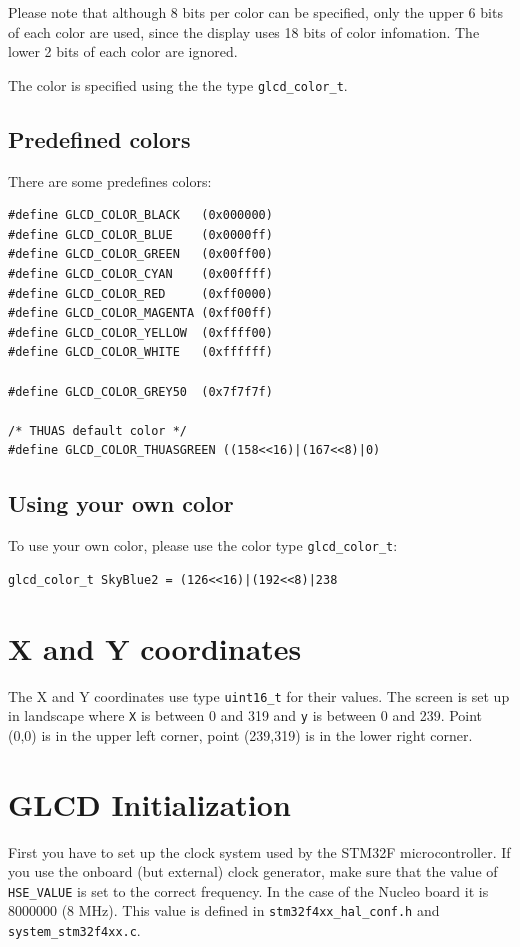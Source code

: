 \documentclass[12pt]{article}
\begin{document}
Please note that although 8 bits per color can be specified, only the upper 6 bits of each color are used, since the display uses 18 bits of color infomation. The lower 2 bits of each color are ignored.

The color is specified using the the type \lstinline|glcd_color_t|.

\subsection{Predefined colors}
There are some predefines colors:

\begin{lstlisting}
#define GLCD_COLOR_BLACK   (0x000000)
#define GLCD_COLOR_BLUE    (0x0000ff)
#define GLCD_COLOR_GREEN   (0x00ff00)
#define GLCD_COLOR_CYAN    (0x00ffff)
#define GLCD_COLOR_RED     (0xff0000)
#define GLCD_COLOR_MAGENTA (0xff00ff)
#define GLCD_COLOR_YELLOW  (0xffff00)
#define GLCD_COLOR_WHITE   (0xffffff)

#define GLCD_COLOR_GREY50  (0x7f7f7f)

/* THUAS default color */
#define GLCD_COLOR_THUASGREEN ((158<<16)|(167<<8)|0)
\end{lstlisting}

\subsection{Using your own color}
To use your own color, please use the color type \lstinline|glcd_color_t|:

\begin{lstlisting}
glcd_color_t SkyBlue2 = (126<<16)|(192<<8)|238
\end{lstlisting}

\section{X and Y coordinates}
The X and Y coordinates use type \lstinline|uint16_t| for their values. The screen is set up in landscape where \lstinline|X| is between 0 and 319 and \lstinline|y| is between 0 and 239. Point (0,0) is in the upper left corner,
point (239,319) is in the lower right corner.



\section{GLCD Initialization}
First you have to set up the clock system used by the STM32F microcontroller. If you use the onboard (but external) clock generator, make sure that the value of \lstinline|HSE_VALUE| is set to the correct frequency. In the case of the Nucleo board it is 8000000 (8 MHz). This value is defined in \lstinline|stm32f4xx_hal_conf.h| and \lstinline|system_stm32f4xx.c|.
\end{document}
